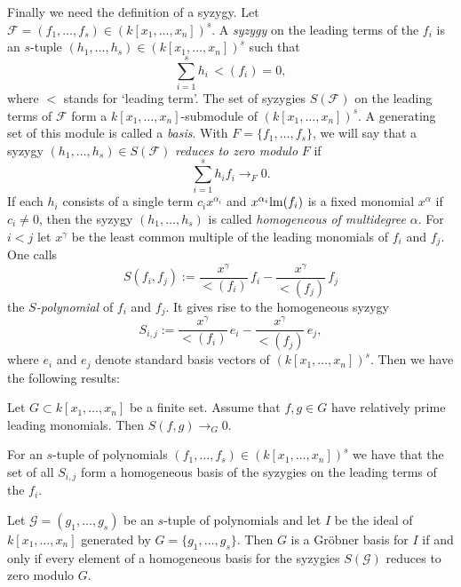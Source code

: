 Finally we need the definition of a syzygy. Let $\mathcal{F}=(f_1,\ldots ,f_s)\in (k[x_1,\ldots,x_n])^s$. A \textit{syzygy} on the leading terms of the $f_i$ is an $s$-tuple $(h_1,\ldots,h_s) \in (k[x_1,\ldots,x_n])^s$ such that 
\[  \sum_{i=1}^s h_i\, \lt(f_i) = 0,\]
where $\lt$ stands for `leading term'. The set of syzygies $S(\mathcal{F})$ on the leading terms of $\mathcal{F}$ form a $k[x_1,\ldots,x_n]$-submodule of $(k[x_1,\ldots,x_n])^s$. A generating set of this module is called a \textit{basis}. With $F=\{f_1,\ldots, f_s\}$, we will say that a syzygy $(h_1,\ldots, h_s)\in S(\mathcal{F})$ \textit{reduces to zero modulo} $F$ if
\[  \sum_{i=1}^s h_if_i \rightarrow_F 0.  \]
If each $h_i$ consists of a single term $c_ix^{\alpha_i}$ and $x^{\alpha_i}\textnormal{lm}(f_i)$ is a fixed monomial $x^{\alpha}$ if $c_i\neq 0$, then the syzygy $(h_1,\ldots, h_s)$ is called \textit{homogeneous of multidegree} $\alpha$. For $i<j$ let $x^{\gamma}$ be the least common multiple of the leading monomials of $f_i$ and $f_j$. One calls
\[ S(f_i,f_j) := \frac{x^{\gamma}}{\lt(f_i)}\, f_i - \frac{x^{\gamma}}{\lt(f_j)}\, f_j \] 
the \textit{$S$-polynomial} of $f_i$ and $f_j$. It gives rise to the homogeneous syzygy
\[  S_{i,j} := \frac{x^{\gamma}}{\lt(f_i)}\, e_i - \frac{x^{\gamma}}{\lt(f_j)}\, e_j, \]
where $e_i$ and $e_j$ denote standard basis vectors of $(k[x_1,\ldots,x_n])^s$. Then we have the following results:

\begin{Prop}\label{prop:coprime_leading_monomials} Let $G\subset k[x_1,\ldots,x_n]$ be a finite set. Assume that $f,g\in G$ have relatively prime leading monomials. Then $S(f,g)\rightarrow_G 0$.
\end{Prop}


\begin{Prop}\label{prop:S_polynomials_form_basis} For an $s$-tuple of polynomials $(f_1,\ldots ,f_s)\in (k[x_1,\ldots,x_n])^s$ we have that the set of all $S_{i,j}$ form a homogeneous basis of the syzygies on the leading terms of the $f_i$.  
\end{Prop}



\begin{Thm}\label{thm:criterion_for_Groebner_basis} Let $\mathcal{G}=(g_1,\ldots,g_s)$ be an $s$-tuple of polynomials and let $I$ be the ideal of $k[x_1,\ldots,x_n]$ generated by $G=\{g_1,\ldots,g_s\}$. Then $G$ is a Gr\"obner basis for $I$ if and only if every element of a homogeneous basis for the syzygies $S(\mathcal{G})$ reduces to zero modulo $G$.
\end{Thm}


